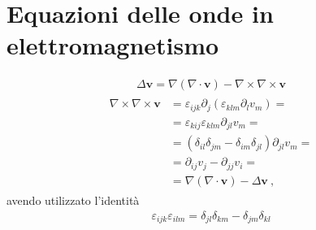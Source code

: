 \documentclass[letterpaper,10pt,english]{jupyterBook}
\begin{document}
\section{Equazioni delle onde in elettromagnetismo}
\label{\detokenize{ch/waves-equation:equazioni-delle-onde-in-elettromagnetismo}}\label{\detokenize{ch/waves-equation:classical-electromagnetism-waves-wave-equation}}\label{\detokenize{ch/waves-equation::doc}}
\sphinxAtStartPar
{}
\begin{equation*}
\begin{split}\Delta \mathbf{v} = \nabla ( \nabla \cdot \mathbf{v} ) - \nabla \times \nabla \times \mathbf{v}\end{split}
\end{equation*}
\sphinxAtStartPar
{}
\begin{equation*}
\begin{split}\begin{aligned}
 \nabla \times \nabla \times \mathbf{v} & = \varepsilon_{ijk} \partial_j ( \varepsilon_{klm} \partial_l v_m ) = \\
 & = \varepsilon_{kij} \varepsilon_{klm} \partial_{jl} v_m = \\
 & = ( \delta_{il} \delta_{jm} - \delta_{im} \delta_{jl} )  \partial_{jl} v_m = \\
 & = \partial_{ij} v_j - \partial_{jj} v_i = \\
 & = \nabla (\nabla \cdot \mathbf{v}) - \Delta \mathbf{v} \ ,
\end{aligned}\end{split}
\end{equation*}
\sphinxAtStartPar
avendo utilizzato l’identità
\begin{equation*}
\begin{split}\varepsilon_{ijk} \varepsilon_{ilm} = \delta_{jl} \delta_{km} - \delta_{jm} \delta_{kl}\end{split}
\end{equation*}
\end{document}

